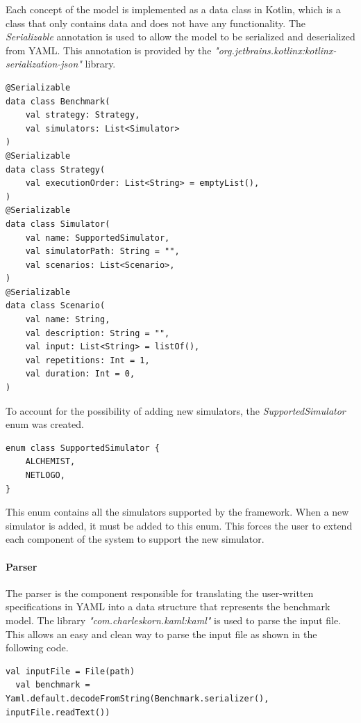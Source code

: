 \documentclass[12pt,a4paper,openright,twoside]{book}
\begin{document}
Each concept of the model is implemented as a data class in Kotlin, which is a class that only contains data and does not have any functionality.
The \emph{Serializable} annotation is used to allow the model to be serialized and deserialized from YAML.
This annotation is provided by the \emph{"org.jetbrains.kotlinx:kotlinx-serialization-json"} library.

\begin{lstlisting}[style=my-kotlin, language=my-kotlin, caption={Benchmark model.}]
@Serializable
data class Benchmark(
    val strategy: Strategy,
    val simulators: List<Simulator>
)
@Serializable
data class Strategy(
    val executionOrder: List<String> = emptyList(),
)
@Serializable
data class Simulator(
    val name: SupportedSimulator,
    val simulatorPath: String = "",
    val scenarios: List<Scenario>,
)
@Serializable
data class Scenario(
    val name: String,
    val description: String = "",
    val input: List<String> = listOf(),
    val repetitions: Int = 1,
    val duration: Int = 0,
)
\end{lstlisting}

To account for the possibility of adding new simulators, the \emph{SupportedSimulator} enum was created.

\begin{lstlisting}[style=my-kotlin, language=my-kotlin, caption={SupportedSimulator enum.}]
  enum class SupportedSimulator {
    ALCHEMIST,
    NETLOGO,
}
\end{lstlisting}

This enum contains all the simulators supported by the framework. When a new simulator is added, it must be added to this enum.
This forces the user to extend each component of the system to support the new simulator.

\paragraph*{Parser}
The parser is the component responsible for translating the user-written specifications in YAML into a data structure that represents the benchmark model.
The library \emph{"com.charleskorn.kaml:kaml"} is used to parse the input file.
This allows an easy and clean way to parse the input file as shown in the following code.

\begin{lstlisting}[style=my-kotlin, language=my-kotlin, caption={Parsing of the input file.}]
  val inputFile = File(path)
  val benchmark = Yaml.default.decodeFromString(Benchmark.serializer(), inputFile.readText())
\end{lstlisting}
\end{document}
